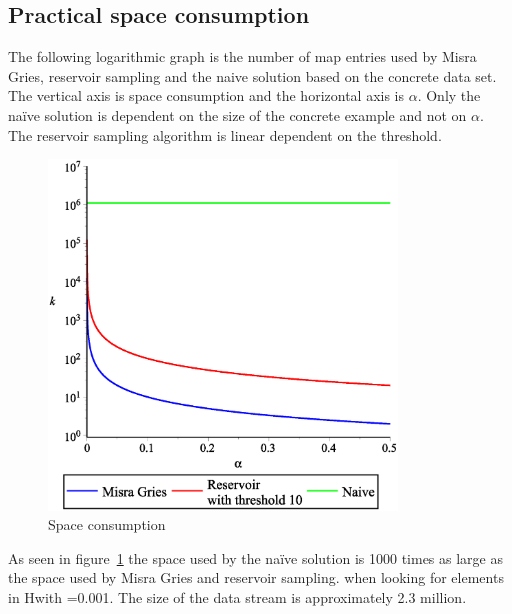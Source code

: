 \subsection{Practical space consumption}
The following logarithmic graph is the number of map entries used by Misra Gries, reservoir sampling and the naive solution based on the concrete data set. The vertical axis is space consumption and the horizontal axis is \(\alpha\). Only the naïve solution is dependent on the size of the concrete example and not on \(\alpha\). The reservoir sampling algorithm is linear dependent on the threshold.
\begin{figure}[H]
	\centering
	\includegraphics[width=350px]{img/streamingMemoryGraph.eps}
	\caption{Space consumption}
	\label{fig:space_consumption}
\end{figure}
As seen in figure~\ref{fig:space_consumption} the space used by the naïve solution is 1000 times as large as the space used by Misra Gries and reservoir sampling. when looking for elements in Hwith =0.001. The size of the data stream is approximately 2.3 million.

